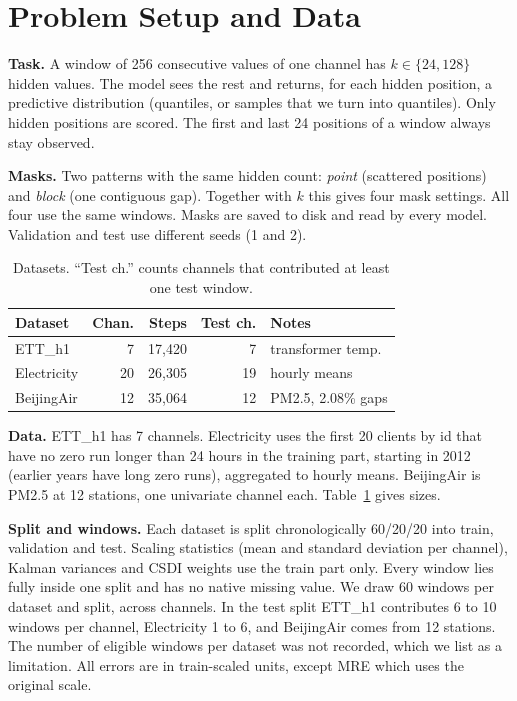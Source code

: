 \documentclass[10pt,twocolumn]{article}
\begin{document}
\section{Problem Setup and Data}\label{sec:setup}
\textbf{Task.} A window of 256 consecutive values of one channel has $k\in\{24,128\}$ hidden values. The model sees the rest and returns, for each hidden position, a predictive distribution (quantiles, or samples that we turn into quantiles). Only hidden positions are scored. The first and last 24 positions of a window always stay observed.

\textbf{Masks.} Two patterns with the same hidden count: \emph{point} (scattered positions) and \emph{block} (one contiguous gap). Together with $k$ this gives four mask settings. All four use the same windows. Masks are saved to disk and read by every model. Validation and test use different seeds (1 and 2).

\begin{table}[t]
\centering\small
\setlength{\tabcolsep}{4pt}
\begin{tabular}{@{}lrrrl@{}}
\toprule
Dataset & Chan. & Steps & Test ch. & Notes \\
\midrule
ETT\_h1 & 7 & 17,420 & 7 & transformer temp.\\
Electricity & 20 & 26,305 & 19 & hourly means\\
BeijingAir & 12 & 35,064 & 12 & PM2.5, 2.08\% gaps\\
\bottomrule
\end{tabular}
\caption{Datasets. ``Test ch.'' counts channels that contributed at least one test window.}
\label{tab:data}
\end{table}

\textbf{Data.} ETT\_h1 \citep{zhou2021informer} has 7 channels. Electricity \citep{trindade2015} uses the first 20 clients by id that have no zero run longer than 24 hours in the training part, starting in 2012 (earlier years have long zero runs), aggregated to hourly means. BeijingAir \citep{zhang2017} is PM2.5 at 12 stations, one univariate channel each. Table~\ref{tab:data} gives sizes.

\textbf{Split and windows.} Each dataset is split chronologically 60/20/20 into train, validation and test. Scaling statistics (mean and standard deviation per channel), Kalman variances and CSDI weights use the train part only. Every window lies fully inside one split and has no native missing value. We draw 60 windows per dataset and split, across channels. In the test split ETT\_h1 contributes 6 to 10 windows per channel, Electricity 1 to 6, and BeijingAir comes from 12 stations. The number of eligible windows per dataset was not recorded, which we list as a limitation. All errors are in train-scaled units, except MRE which uses the original scale.
\end{document}
